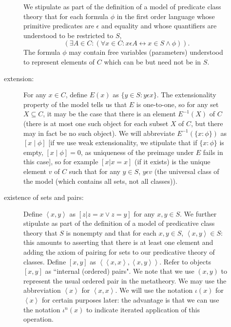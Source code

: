 \documentclass[12pt]{article}
\begin{document}
\begin{description}
\begin{description}
We stipulate as part of the definition of a model of predicate class theory that for each formula $\phi$ in the first order language whose primitive predicates are $\epsilon$ and equality and whose quantifiers are understood to be restricted to $S$, $$(\exists A \in C:(\forall x \in C:x \epsilon A \leftrightarrow x \in S \wedge \phi)).$$  The formula $\phi$ may contain free variables (parameters) understood to represent elements of $C$ which can be but need not be in $S$.

\item[extension:]  For any $x \in C$, define $E(x)$ as $\{y \in S:y\epsilon x\}$.   The extensionality property of the model tells us that $E$ is one-to-one, so for any set $X \subseteq C$, it may be the case that there is an element $E^{-1}(X)$ of $C$ (there is at most one such object for each subset $X$ of $C$, but there may in fact be no such object).  We will abbreviate $E^{-1}(\{x : \phi\})$ as $[x\mid \phi]$ [if we use weak extensionality, we stipulate that if $\{x : \phi\}$ is empty, $[x\mid \phi]=0$, as uniqueness of the preimage under $E$ fails in this case], so for example $[x|x=x]$ (if it exists) is the unique element $v$ of $C$ such that for any $y \in S$, $y \epsilon v$ (the universal class of the model (which contains all sets, not all classes)). 

\item[existence of sets and pairs:]  Define $\left<x,y\right>$ as $[z|z=x \vee z=y]$ for any $x,y \in S$. We further stipulate as part of the definition of a model of predicative class theory that $S$ is nonempty and that for each $x,y \in S$, $\left<x,y\right> \in S$:  this amounts to asserting that there is at least one element and adding the axiom of pairing for sets to our predicative theory of classes.  Define $[x,y]$ as $\left<\left<x,x\right>,\left<x,y\right>\right>$.    Refer to objects $[x,y]$ as ``internal (ordered) pairs".   We note that we use $(x,y)$ to represent the usual ordered pair in the metatheory.  We may use the abbreviation $\left<x\right>$ for $\left<x,x\right>$.  We will use the notation $\iota(x)$ for $\left< x\right>$ for certain purposes later:  the advantage is that we can use the notation $\iota^n(x)$ to indicate iterated application of this operation.


\end{description}
\end{description}
\end{document}
